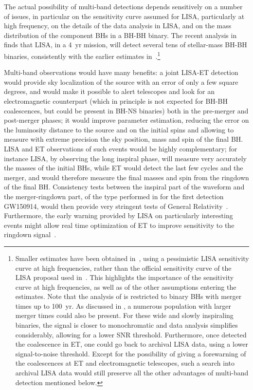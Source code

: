 The actual possibility of  multi-band detections depends sensitively on a number of issues, in particular on the sensitivity curve assumed for LISA, particularly at high frequency, on  the details of the data analysis in LISA, and on the  mass distribution of the component BHs in  a BH-BH binary. The recent analysis in \cite{Caputo:2020irr} finds that LISA, in a 4~yr mission, will detect several tens of  stellar-mass  BH-BH binaries, consistently with the earlier estimates in~\cite{Sesana:2016ljz,Tamanini:2019usx}.\footnote{Smaller estimates have been obtained in~\cite{Moore:2019pke}, using a pessimistic LISA sensitivity curve at high frequencies, rather than  the official sensitivity curve of the LISA proposal used in~\cite{Caputo:2020irr}. 
This highlights the importance of the sensitivity curve at high frequencies, as well as of the other assumptions entering the estimates. Note that the analysis of
\cite{Moore:2019pke} is restricted to binary BHs with merger times up to 100~yr. As discussed in
\cite{Moore:2019pke}, a  numerous population with larger merger times could also be present. For these wide and slowly inspiraling binaries, the signal is closer to monochromatic and data analysis simplifies considerably, allowing for a lower SNR threshold.
Furthermore, once detected the coalescence in ET, one could go back to archival LISA data, using a lower signal-to-noise threshold. Except for the possibility of giving a forewarning of the coalescences at ET and electromagnetic telescopes, such a search into archival LISA data would still preserve all the other advantages of multi-band detection mentioned below.}

Multi-band observations would have many benefits: a joint LISA-ET detection would provide
sky localization of the source with an error of only a few square degrees, and 
would make it possible to alert telescopes and look for an electromagnetic counterpart (which in principle is not expected for BH-BH coalescences, but could be present in BH-NS binaries) both  in the pre-merger and post-merger phases; it
would improve parameter estimation, reducing the error on the luminosity distance to the source and on the initial spins  and  allowing to measure with extreme precision the sky position, mass and spin of the final BH. LISA and ET observations of such events would be highly complementary; for instance LISA, by observing the long inspiral phase, will measure very accurately the masses of the initial BHs, while ET  would detect  the last few cycles and the merger, and would therefore measure the final masses and spin from the ringdown of the final BH. Consistency tests  between the
inspiral part of the waveform and the merger-ringdown part, of the type performed in \cite{TheLIGOScientific:2016src} for the first detection GW150914, would then provide very stringent tests of General Relativity~\cite{Vitale:2016rfr}.
Furthermore, the early warning provided by LISA on particularly interesting events might allow real time optimization of ET  to improve sensitivity to the ringdown signal~\cite{Tso:2018pdv}.



